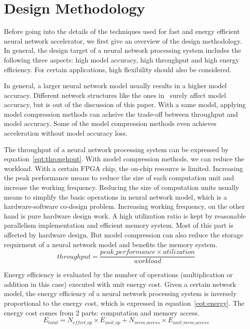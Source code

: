 \section{Design Methodology}\label{sec:design_method}

Before going into the details of the techniques used for fast and energy efficient neural network accelerator, we first give an overview of the design methodology. In general, the design target of a neural network processing system includes the following three aspects: high model accuracy, high throughput and high energy efficiency. For certain applications, high flexibility should also be considered.

In general, a larger neural network model usually results in a higher model accuracy. Different network structures like the ones in~\cite{krizhevsky2012imagenet, simonyan2014very, he2016deep} surely affect model accuracy, but is out of the discussion of this paper. With a same model, applying model compression methods can acheive the trade-off between throughput and model accuracy. Some of the model compression methods even achieves acceleration without model accuracy loss.

The throughput of a neural network processing system can be expressed by equation~\ref{eqt:throughput}. With model compression methods, we can reduce the workload. With a certain FPGA chip, the on-chip resource is limited. Increasing the peak performance means to reduce the size of each computation unit and increase the working frequency. Reducing the size of computation units usually means to simplify the basic operations in neural network model, which is a hardware-software co-design problem. Increasing working frequency, on the other hand is pure hardware design work. A high utilization ratio is kept by reasonable parallelism implementation and efficient memory system. Most of this part is affected by hardware design. But model compression can also reduce the storage requirment of a neural network model and benefits the memory system.
\begin{equation}\label{eqt:throughput}
    throughput = \frac{peak\_performance \times utilization}{workload}
\end{equation}

Energy efficiency is evaluated by the number of operations (multiplication or addition in this case) executed with unit energy cost. Given a certain network model, the energy efficiency of a neural network processing system is inversely proportional to the energy cost, which is expressed in equation~\ref{eqt:energy}. The energy cost comes from 2 parts: computation and memory access. 
\begin{equation}\label{eqt:energy}
    E_{total} = N_{effect\_op}\times E_{unit\_op} + N_{mem\_access}\times E_{unit\_mem\_access}
\end{equation}


